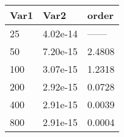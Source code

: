 \begin{tabular}{lll}
Var1 & Var2 & order \\ 
\hline 
25 & 4.02e-14 & ------ \\ 
50 & 7.20e-15 & 2.4808 \\ 
100 & 3.07e-15 & 1.2318 \\ 
200 & 2.92e-15 & 0.0728 \\ 
400 & 2.91e-15 & 0.0039 \\ 
800 & 2.91e-15 & 0.0004 \\ 
\hline 
\end{tabular}